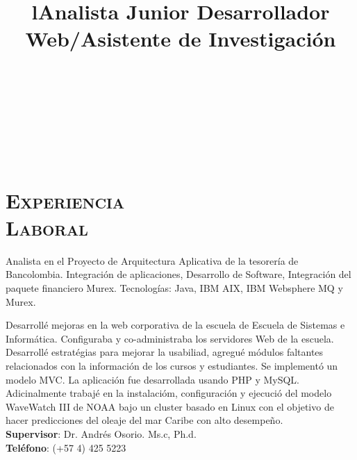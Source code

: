 \begin{resume}

\begin{formatb}
  \title{l}\\
 \\
  \body\\
\end{formatb}

\section{\textsc{\\Experiencia \\ Laboral}}


\title{\textbf{Analista Junior} }
\begin{position}
Analista en el Proyecto de Arquitectura Aplicativa de la tesorer\'{i}a de
Bancolombia.
Integraci\'{o}n de aplicaciones, Desarrollo de
Software, Integraci\'{o}n del paquete financiero Murex. 
Tecnolog\'{i}as: Java, IBM AIX, IBM Websphere MQ y Murex.
\end{position}

\title{\textbf{Desarrollador Web/Asistente de Investigaci\'{o}n} }
\begin{position}
Desarroll\'{e} mejoras en la web corporativa de la escuela de Escuela
de Sistemas e Inform\'{a}tica. Configuraba y  co-administraba los
servidores Web de la escuela. Desarroll\'{e} estrat\'{e}gias para
mejorar la usabiliad, agregu\'{e} m\'{o}dulos faltantes relacionados
con la informaci\'{o}n de los cursos y estudiantes. Se implement\'{o}
un modelo MVC. La aplicaci\'{o}n fue desarrollada usando PHP y
MySQL.\\
Adicinalmente trabaj\'{e} en la instalaci\'{o}m, configuraci\'{o}n y ejecuci\'{o}  del modelo WaveWatch III de NOAA bajo un cluster basado en Linux con el objetivo de hacer predicciones del oleaje del mar Caribe con alto desempe\~{n}o.\\
\textbf{Supervisor}: Dr. Andr\'{e}s Osorio. Ms.c, Ph.d.\\
\textbf{Tel\'{e}fono}: (+57 4) 425 5223
\end{position}


\end{resume}
